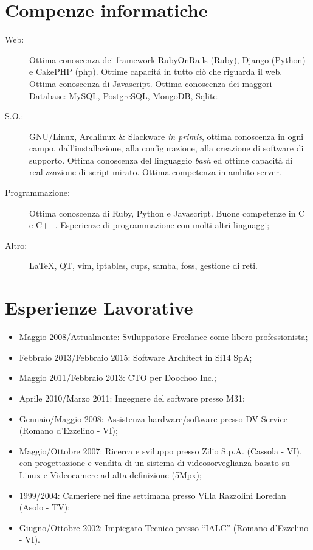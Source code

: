 \documentclass[pdftex, a4paper, 11pt]{article}
\begin{document}
\section*{Compenze informatiche}
\begin{description}
\item[Web:] Ottima conoscenza dei framework RubyOnRails (Ruby), Django
  (Python) e CakePHP (php). Ottime capacit\'a in
  tutto ci\`o che riguarda il web. Ottima conoscenza
  di Javascript. Ottima conoscenza dei maggori Database: MySQL, PostgreSQL, MongoDB, Sqlite.
\item[S.O.:] GNU/Linux, Archlinux \& Slackware {\em in primis},
  ottima conoscenza
  in ogni campo, dall'installazione, alla configurazione, alla
  creazione di software di supporto. Ottima conoscenza del linguaggio
  {\em bash} ed ottime capacit\`a di realizzazione di script
  mirato. Ottima competenza in ambito server.
\item[Programmazione:] Ottima conoscenza di Ruby, Python e Javascript. Buone competenze in C e C++.
  Esperienze di programmazione con molti altri linguaggi;
\item[Altro:] \LaTeX, QT, vim, iptables, cups, samba, foss, gestione di reti.
\end{description}

\section*{Esperienze Lavorative}
\begin{itemize}
  \item Maggio 2008/Attualmente: Sviluppatore Freelance come libero professionista;
  \item Febbraio 2013/Febbraio 2015: Software Architect in Si14 SpA;
  \item Maggio 2011/Febbraio 2013: CTO per Doochoo Inc.;
  \item Aprile 2010/Marzo 2011: Ingegnere del software presso M31;
\item Gennaio/Maggio 2008: Assistenza hardware/software presso DV
  Service (Romano d'Ezzelino - VI);
\item Maggio/Ottobre 2007: Ricerca e sviluppo presso Zilio
  S.p.A. (Cassola - VI), con progettazione e vendita di un sistema di
  videosorveglianza basato su Linux e Videocamere ad alta definizione
  (5Mpx);
\item 1999/2004: Cameriere nei fine settimana presso Villa Razzolini
  Loredan (Asolo - TV);
\item Giugno/Ottobre 2002: Impiegato Tecnico presso ``IALC'' (Romano
  d'Ezzelino - VI).
\end{itemize}
\end{document}
